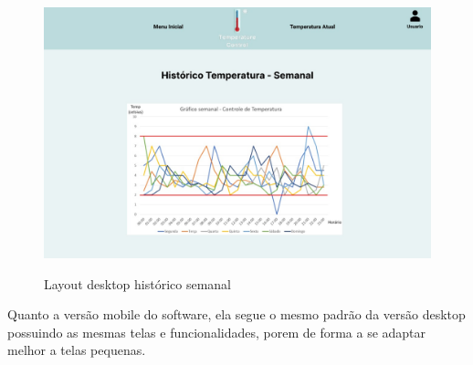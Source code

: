     \begin{figure}
        \caption{Layout desktop histórico semanal}
        \centering
        \includegraphics[scale=0.35]{img/desktop/temp_semanal.jpeg}
        \label{fig:desktopTempSemanal}
    \end{figure}


    \newpage

    Quanto a versão mobile do software,
    ela segue o mesmo padrão da versão desktop 
    possuindo as mesmas telas e funcionalidades,
    porem de forma a se adaptar melhor a telas 
    pequenas.


